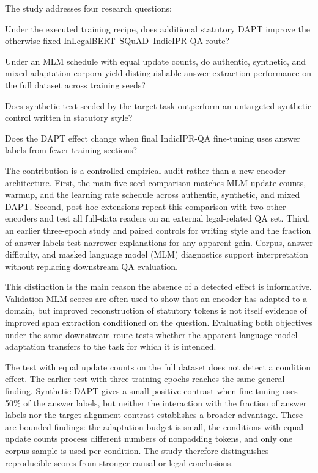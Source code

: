 \documentclass[pdflatex,sn-basic]{sn-jnl}
\begin{document}
The study addresses four research questions:
\begin{description}[leftmargin=1.8cm,style=nextline]
\item[RQ1: Efficacy.] Under the executed training recipe, does additional
statutory DAPT improve the otherwise fixed InLegalBERT--SQuAD--IndicIPR-QA route?
\item[RQ2: Composition.] Under an MLM schedule with equal update counts, do authentic,
synthetic, and mixed adaptation corpora yield distinguishable answer extraction
performance on the full dataset across training seeds?
\item[RQ3: Target alignment.] Does synthetic text seeded by the target task
outperform an untargeted synthetic control written in statutory style?
\item[RQ4: Answer label fraction.] Does the DAPT effect change when final
IndicIPR-QA fine-tuning uses answer labels from fewer training sections?
\end{description}

The contribution is a controlled empirical audit rather than a new encoder
architecture. First, the main five-seed comparison matches MLM update counts,
warmup, and the learning rate schedule across authentic, synthetic, and mixed
DAPT. Second, post hoc extensions repeat this comparison with two other
encoders and test all full-data readers on an external legal-related QA set.
Third, an earlier three-epoch study and paired controls for writing style and
the fraction of answer labels test narrower explanations for any apparent
gain. Corpus, answer difficulty, and masked language model (MLM) diagnostics
support interpretation without replacing downstream QA evaluation.

This distinction is the main reason the absence of a detected effect is informative.
Validation MLM scores are often used to show that an encoder has adapted to a
domain, but improved reconstruction of statutory tokens is not itself evidence
of improved span extraction conditioned on the question. Evaluating both objectives
under the same downstream route tests whether the apparent language model
adaptation transfers to the task for which it is intended.

The test with equal update counts on the full dataset does not detect a
condition effect. The earlier test with three training epochs reaches the same
general finding. Synthetic DAPT gives a small positive contrast when fine-tuning
uses 50\% of the answer labels, but neither the interaction with the fraction of
answer labels nor the target alignment contrast establishes
a broader advantage. These are bounded findings: the adaptation budget is
small, the conditions with equal update counts process different numbers of nonpadding
tokens, and only one corpus sample is used per condition. The study therefore
distinguishes reproducible scores from stronger causal or legal conclusions.
\end{document}
